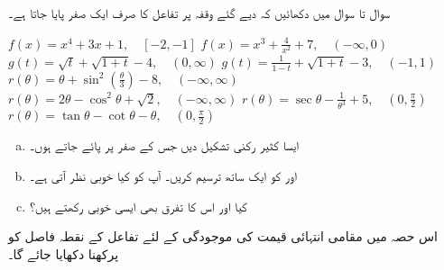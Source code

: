 سوال  تا سوال  میں دکھائیں کہ دیے گئے وقفہ پر تفاعل کا صرف ایک صفر پایا جاتا ہے۔

$f(x)=x^4+3x+1,\quad [-2,-1]$
$f(x)=x^3+\tfrac{4}{x^2}+7,\quad (-\infty,0)$
$g(t)=\sqrt{t}+\sqrt{1+t}-4,\quad (0,\infty)$
$g(t)=\tfrac{1}{1-t}+\sqrt{1+t}-3,\quad (-1,1)$
$r(\theta)=\theta+\sin^2(\tfrac{\theta}{3})-8,\quad (-\infty,\infty)$
$r(\theta)=2\theta-\cos^2\theta+\sqrt{2},\quad (-\infty,\infty)$
$r(\theta)=\sec\theta-\tfrac{1}{\theta^3}+5,\quad (0,\tfrac{\pi}{2})$
$r(\theta)=\tan\theta-\cot\theta-\theta,\quad (0,\tfrac{\pi}{2})$
\\
\begin{enumerate}[a.]
\item
ایسا کثیر رکنی  تشکیل دیں جس کے صفر  پر پائے جاتے ہوں۔
\item
{} اور  کو ایک ساتھ ترسیم کریں۔ آپ کو کیا خوبی نظر آتی ہے۔
\item
کیا  اور اس کا تفرق   بھی ایسی خوبی رکھتے ہیں؟
\end{enumerate}

اس حصہ میں مقامی انتہائی قیمت کی موجودگی کے لئے تفاعل کے نقطہ فاصل  کو پرکھنا دکھایا جائے گا۔ 

